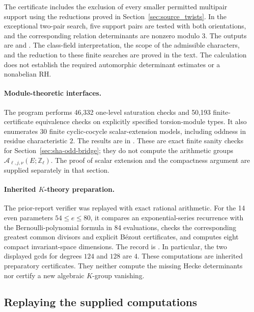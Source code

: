 The certificate includes the exclusion of every smaller permitted
multipair support using the reductions proved in
Section~\ref{sec:source_twists}. In the exceptional two-pair search,
five support pairs are tested with both orientations, and the
corresponding relation determinants are nonzero modulo \(3\).
The outputs are
 and
.
The class-field interpretation, the scope of the admissible
characters, and the reduction to these finite searches are proved
in the text. The calculation does not establish the required
automorphic determinant estimates or a nonabelian RH.

\paragraph{Module-theoretic interfaces.}
The program  performs 46,332
one-level saturation checks and 50,193 finite-certificate equivalence
checks on explicitly specified torsion-module types. It also
enumerates 30 finite cyclic-cocycle scalar-extension models,
including oddness in residue characteristic \(2\).
The results are in .
These are exact finite sanity checks for
Section~\ref{sec:sha-odd-bridge}; they do not compute the arithmetic
groups \(\mathcal A_{\ell,j,\nu}(E;\mathbb Z_\ell)\).
The proof of scalar extension and the compactness argument are
supplied separately in that section.

\paragraph{Inherited \(K\)-theory preparation.}
The prior-report verifier 
was replayed with exact rational arithmetic. For the 14 even
parameters \(54\leq e\leq80\), it compares an exponential-series
recurrence with the Bernoulli-polynomial formula in 84 evaluations,
checks the corresponding greatest common divisors and explicit
B\'ezout certificates, and computes eight compact invariant-space
dimensions. The record is
.
In particular, the two displayed gcds for degrees \(124\) and
\(128\) are \(4\). These computations are inherited preparatory
certificates. They neither compute the missing Hecke determinants
nor certify a new algebraic \(K\)-group vanishing.

\subsection{Replaying the supplied computations}

